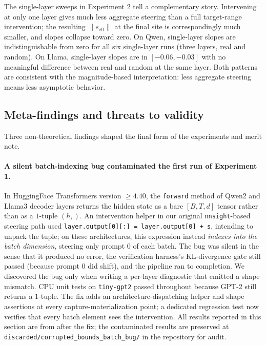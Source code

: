 The single-layer sweeps in Experiment 2 tell a complementary story. Intervening at only one layer gives much less aggregate steering than a full target-range intervention; the resulting $\|s_\mathrm{eff}\|$ at the final site is correspondingly much smaller, and slopes collapse toward zero. On Qwen, single-layer slopes are indistinguishable from zero for all six single-layer runs (three layers, real and random). On Llama, single-layer slopes are in $[-0.06, -0.03]$ with no meaningful difference between real and random at the same layer. Both patterns are consistent with the magnitude-based interpretation: less aggregate steering means less asymptotic behavior.

\subsection{Meta-findings and threats to validity}
\label{sec:empirical-threats}

Three non-theoretical findings shaped the final form of the experiments and merit note.

\paragraph{A silent batch-indexing bug contaminated the first run of Experiment 1.}
In HuggingFace Transformers version $\geq 4.40$, the \texttt{forward} method of Qwen2 and Llama3 decoder layers returns the hidden state as a bare $[B, T, d]$ tensor rather than as a $1$-tuple $(h,)$. An intervention helper in our original \texttt{nnsight}-based steering path used \texttt{layer.output[0][:] = layer.output[0] + s}, intending to unpack the tuple; on these architectures, this expression instead \emph{indexes into the batch dimension}, steering only prompt $0$ of each batch. The bug was silent in the sense that it produced no error, the verification harness's KL-divergence gate still passed (because prompt $0$ did shift), and the pipeline ran to completion. We discovered the bug only when writing a per-layer diagnostic that emitted a shape mismatch. CPU unit tests on \texttt{tiny-gpt2} passed throughout because GPT-2 still returns a $1$-tuple. The fix adds an architecture-dispatching helper and shape assertions at every capture-materialization point; a dedicated regression test now verifies that every batch element sees the intervention. All results reported in this section are from after the fix; the contaminated results are preserved at \texttt{discarded/corrupted\_bounds\_batch\_bug/} in the repository for audit.

